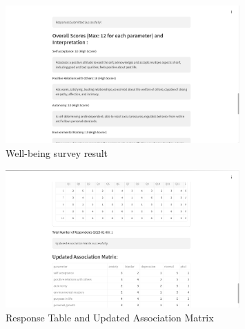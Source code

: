 \begin{figure}[h!]  
    \centering
    \includegraphics[width=0.8\textwidth]{App Images/30 Interface.png}  
    \caption{Well-being survey result}
    \label{10i23445}  %
\end{figure} 

\begin{figure}[h!]  
    \centering
    \includegraphics[width=0.8\textwidth]{App Images/31 Interface.png}  
    \caption{Response Table and Updated Association Matrix}
    \label{10i23445}  %
\end{figure} 

